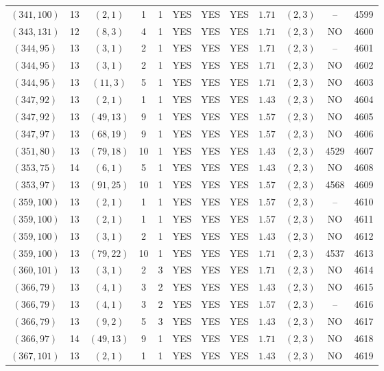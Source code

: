 \begin{longtable}{|c|c|c|c|c|c|c|c|c|c|c|c|}
$(341,100)$ & 13 & $(2,1)$ & 1 & 1 & YES & YES & YES & $1.71$ & $(2,3)$ & -- & 4599\\
$(343,131)$ & 12 & $(8,3)$ & 4 & 1 & YES & YES & YES & $1.71$ & $(2,3)$ & NO & 4600\\
$(344,95)$ & 13 & $(3,1)$ & 2 & 1 & YES & YES & YES & $1.71$ & $(2,3)$ & -- & 4601\\
$(344,95)$ & 13 & $(3,1)$ & 2 & 1 & YES & YES & YES & $1.71$ & $(2,3)$ & NO & 4602\\
$(344,95)$ & 13 & $(11,3)$ & 5 & 1 & YES & YES & YES & $1.71$ & $(2,3)$ & NO & 4603\\
$(347,92)$ & 13 & $(2,1)$ & 1 & 1 & YES & YES & YES & $1.43$ & $(2,3)$ & NO & 4604\\
$(347,92)$ & 13 & $(49,13)$ & 9 & 1 & YES & YES & YES & $1.57$ & $(2,3)$ & NO & 4605\\
$(347,97)$ & 13 & $(68,19)$ & 9 & 1 & YES & YES & YES & $1.57$ & $(2,3)$ & NO & 4606\\
$(351,80)$ & 13 & $(79,18)$ & 10 & 1 & YES & YES & YES & $1.43$ & $(2,3)$ & 4529 & 4607\\
$(353,75)$ & 14 & $(6,1)$ & 5 & 1 & YES & YES & YES & $1.43$ & $(2,3)$ & NO & 4608\\
$(353,97)$ & 13 & $(91,25)$ & 10 & 1 & YES & YES & YES & $1.57$ & $(2,3)$ & 4568 & 4609\\
$(359,100)$ & 13 & $(2,1)$ & 1 & 1 & YES & YES & YES & $1.57$ & $(2,3)$ & -- & 4610\\
$(359,100)$ & 13 & $(2,1)$ & 1 & 1 & YES & YES & YES & $1.57$ & $(2,3)$ & NO & 4611\\
$(359,100)$ & 13 & $(3,1)$ & 2 & 1 & YES & YES & YES & $1.43$ & $(2,3)$ & NO & 4612\\
$(359,100)$ & 13 & $(79,22)$ & 10 & 1 & YES & YES & YES & $1.71$ & $(2,3)$ & 4537 & 4613\\
$(360,101)$ & 13 & $(3,1)$ & 2 & 3 & YES & YES & YES & $1.71$ & $(2,3)$ & NO & 4614\\
$(366,79)$ & 13 & $(4,1)$ & 3 & 2 & YES & YES & YES & $1.43$ & $(2,3)$ & NO & 4615\\
$(366,79)$ & 13 & $(4,1)$ & 3 & 2 & YES & YES & YES & $1.57$ & $(2,3)$ & -- & 4616\\
$(366,79)$ & 13 & $(9,2)$ & 5 & 3 & YES & YES & YES & $1.43$ & $(2,3)$ & NO & 4617\\
$(366,97)$ & 14 & $(49,13)$ & 9 & 1 & YES & YES & YES & $1.71$ & $(2,3)$ & NO & 4618\\
$(367,101)$ & 13 & $(2,1)$ & 1 & 1 & YES & YES & YES & $1.43$ & $(2,3)$ & NO & 4619\\

\end{longtable}
